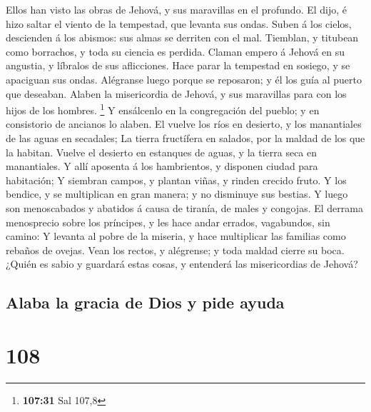  Ellos han visto las obras de Jehová, y sus maravillas en
el profundo.  El dijo, é hizo saltar el viento de la
tempestad, que levanta sus ondas.  Suben á los cielos,
descienden á los abismos: sus almas se derriten con el mal.
 Tiemblan, y titubean como borrachos, y toda su ciencia es
perdida.  Claman empero á Jehová en su angustia, y líbralos
de sus aflicciones.  Hace parar la tempestad en sosiego, y
se apaciguan sus ondas.  Alégranse luego porque se
reposaron; y él los guía al puerto que deseaban.  Alaben la
misericordia de Jehová, y sus maravillas para con los hijos de los
hombres. \footnote{\textbf{107:31} Sal 107,8}  Y ensálcenlo
en la congregación del pueblo; y en consistorio de ancianos lo alaben.
 El vuelve los ríos en desierto, y los manantiales de las
aguas en secadales;  La tierra fructífera en salados, por
la maldad de los que la habitan.  Vuelve el desierto en
estanques de aguas, y la tierra seca en manantiales.  Y
allí aposenta á los hambrientos, y disponen ciudad para habitación;
 Y siembran campos, y plantan viñas, y rinden crecido
fruto.  Y los bendice, y se multiplican en gran manera; y
no disminuye sus bestias.  Y luego son menoscabados y
abatidos á causa de tiranía, de males y congojas.  El
derrama menosprecio sobre los príncipes, y les hace andar errados,
vagabundos, sin camino:  Y levanta al pobre de la miseria,
y hace multiplicar las familias como rebaños de ovejas. 
Vean los rectos, y alégrense; y toda maldad cierre su boca.
 ¿Quién es sabio y guardará estas cosas, y entenderá las
misericordias de Jehová?

\hypertarget{alaba-la-gracia-de-dios-y-pide-ayuda}{%
\subsection{Alaba la gracia de Dios y pide
ayuda}\label{alaba-la-gracia-de-dios-y-pide-ayuda}}

\hypertarget{section-107}{%
\section{108}\label{section-107}}

